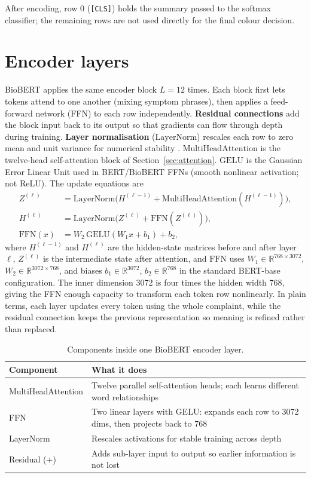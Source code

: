 After encoding, row 0 (\texttt{[CLS]}) holds the summary passed to the softmax classifier; the remaining rows are not used directly for the final colour decision.

\section{Encoder layers}
\label{sec:encoder}

BioBERT applies the same encoder block \(L=12\) times. Each block first lets tokens attend to one another (mixing symptom phrases), then applies a feed-forward network (FFN) to each row independently. \textbf{Residual connections} add the block input back to its output so that gradients can flow through depth during training. \textbf{Layer normalisation} (\(\mathrm{LayerNorm}\)) rescales each row to zero mean and unit variance for numerical stability \citep{vaswani2017attention,devlin2019bert}. \(\mathrm{MultiHeadAttention}\) is the twelve-head self-attention block of Section~\ref{sec:attention}. \(\mathrm{GELU}\) is the Gaussian Error Linear Unit used in BERT/BioBERT FFNs (smooth nonlinear activation; not ReLU). The update equations are
\begin{align}
  Z^{(\ell)} &= \mathrm{LayerNorm}\!\bigl(H^{(\ell-1)} + \mathrm{MultiHeadAttention}(H^{(\ell-1)})\bigr), \\
  H^{(\ell)} &= \mathrm{LayerNorm}\!\bigl(Z^{(\ell)} + \mathrm{FFN}(Z^{(\ell)})\bigr), \\
  \mathrm{FFN}(x) &= W_2\,\mathrm{GELU}(W_1 x + b_1) + b_2,
\end{align}
where \(H^{(\ell-1)}\) and \(H^{(\ell)}\) are the hidden-state matrices before and after layer \(\ell\), \(Z^{(\ell)}\) is the intermediate state after attention, and \(\mathrm{FFN}\) uses \(W_1 \in \mathbb{R}^{768 \times 3072}\), \(W_2 \in \mathbb{R}^{3072 \times 768}\), and biases \(b_1 \in \mathbb{R}^{3072}\), \(b_2 \in \mathbb{R}^{768}\) in the standard BERT-base configuration. The inner dimension 3072 is four times the hidden width 768, giving the FFN enough capacity to transform each token row nonlinearly. In plain terms, each layer updates every token using the whole complaint, while the residual connection keeps the previous representation so meaning is refined rather than replaced.

\begin{table}[H]
\centering
\small
\begin{tabular}{|p{3.2cm}|p{8.8cm}|}
\hline
\textbf{Component} & \textbf{What it does} \\
\hline
MultiHeadAttention & Twelve parallel self-attention heads; each learns different word relationships \\
FFN & Two linear layers with GELU: expands each row to 3072 dims, then projects back to 768 \\
LayerNorm & Rescales activations for stable training across depth \\
Residual (\(+\)) & Adds sub-layer input to output so earlier information is not lost \\
\hline
\end{tabular}
\caption{Components inside one BioBERT encoder layer.}
\label{tab:encoder-components}
\end{table}

